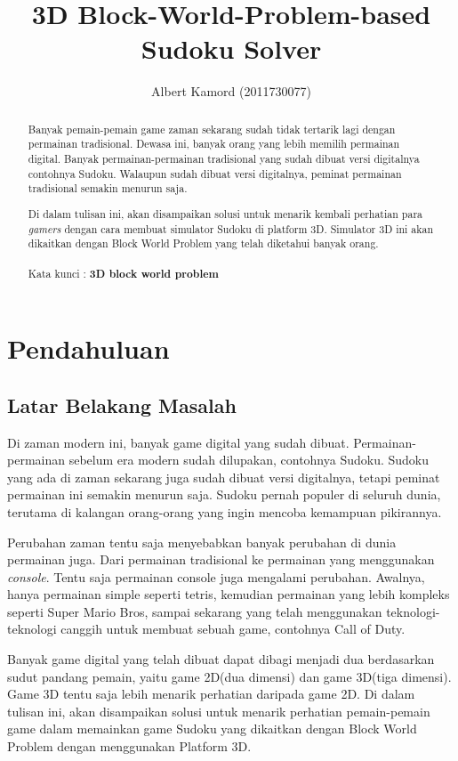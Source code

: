 \documentclass[11pt,a4paper]{report}
\author{Albert Kamord (2011730077)}
\title{3D Block-World-Problem-based Sudoku Solver}
\begin{document}
\maketitle
\begin{abstract}

\indent Banyak pemain-pemain game zaman sekarang sudah tidak tertarik lagi dengan permainan tradisional. Dewasa ini, banyak orang yang lebih memilih permainan digital. Banyak permainan-permainan tradisional yang sudah dibuat versi digitalnya contohnya Sudoku. Walaupun sudah dibuat versi digitalnya, peminat permainan tradisional semakin menurun saja.

\indent Di dalam tulisan ini, akan disampaikan solusi untuk menarik kembali perhatian para \textit{gamers} dengan cara membuat simulator Sudoku di platform 3D. Simulator 3D ini akan dikaitkan dengan Block World Problem yang telah diketahui banyak orang. \\
\\
Kata kunci : \textbf{3D block world problem}
\end{abstract}

\tableofcontents \newpage 	%
\listoffigures \newpage 	%


\chapter{Pendahuluan} %
\section{Latar Belakang Masalah}
\indent Di zaman modern ini, banyak game digital yang sudah dibuat. Permainan-permainan sebelum era modern sudah dilupakan, contohnya Sudoku. Sudoku yang ada di zaman sekarang juga sudah dibuat versi digitalnya, tetapi peminat permainan ini semakin menurun saja. Sudoku pernah populer di seluruh dunia, terutama di kalangan orang-orang yang ingin mencoba kemampuan pikirannya.

\indent Perubahan zaman tentu saja menyebabkan banyak perubahan di dunia permainan juga. Dari permainan tradisional ke permainan yang menggunakan \textit{console}. Tentu saja permainan console juga mengalami perubahan. Awalnya, hanya permainan simple seperti tetris, kemudian permainan yang lebih kompleks seperti Super Mario Bros, sampai sekarang yang telah menggunakan teknologi-teknologi canggih untuk membuat sebuah game, contohnya Call of Duty.

\indent Banyak game digital yang telah dibuat dapat dibagi menjadi dua berdasarkan sudut pandang pemain, yaitu game 2D(dua dimensi) dan game 3D(tiga dimensi). Game 3D tentu saja lebih menarik perhatian daripada game 2D. Di dalam tulisan ini, akan disampaikan solusi untuk menarik perhatian pemain-pemain game dalam memainkan game Sudoku yang dikaitkan dengan Block World Problem dengan menggunakan Platform 3D.
\end{document}
